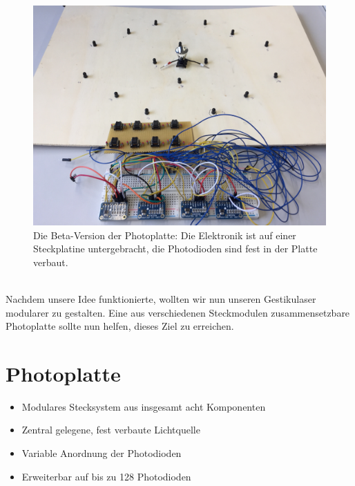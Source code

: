 \documentclass{sciposter}
\begin{document}
\begin{multicols}{3}
\begin{figure}[h]
	\centering
	\includegraphics[scale=0.2]{../figures/PhotoplatteBeta.jpeg}
	\caption{Die Beta-Version der Photoplatte: Die Elektronik ist auf einer Steckplatine untergebracht, die Photodioden sind fest in der Platte verbaut.}
	\label{fig:PhotoplatteBeta}
\end{figure} \\
\noindent
Nachdem unsere Idee funktionierte, wollten wir nun unseren Gestikulaser modularer zu gestalten. Eine aus verschiedenen Steckmodulen zusammensetzbare Photoplatte sollte nun helfen, dieses Ziel zu erreichen.


\section{Photoplatte}
\noindent

\begin{itemize}
	\item Modulares Stecksystem aus insgesamt acht Komponenten
	\item Zentral gelegene, fest verbaute Lichtquelle
	\item Variable Anordnung der Photodioden
	\item Erweiterbar auf bis zu 128 Photodioden
\end{itemize}


\end{multicols}
\end{document}

